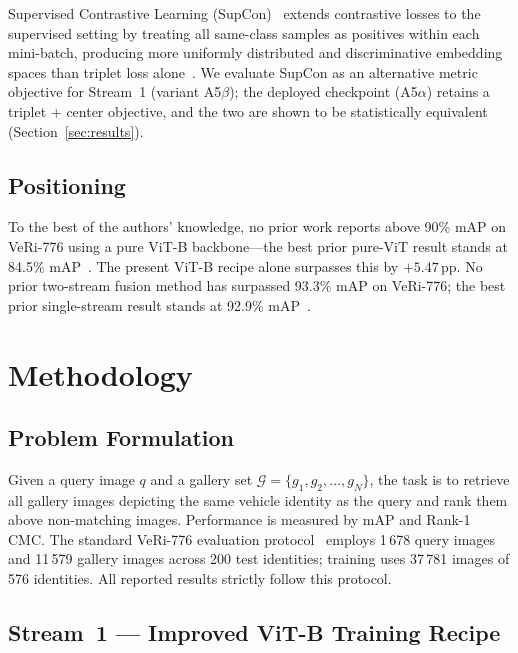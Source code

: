 \documentclass[11pt]{article}
\begin{document}
Supervised Contrastive Learning (SupCon)~\cite{khosla2020supcon} extends
contrastive losses to the supervised setting by treating all same-class samples
as positives within each mini-batch, producing more uniformly distributed and
discriminative embedding spaces than triplet loss alone~\cite{ye2021reidsurvey}.
We evaluate SupCon as an alternative metric objective for Stream~1 (variant
A5$\beta$); the deployed checkpoint (A5$\alpha$) retains a triplet + center
objective, and the two are shown to be statistically equivalent
(Section~\ref{sec:results}).

\subsection{Positioning}
To the best of the authors' knowledge, no prior work reports above 90\% mAP
on VeRi-776 using a pure ViT-B backbone---the best prior pure-ViT result
stands at 84.5\% mAP~\cite{li2023clipreid,opencodepapers2024veri}. The
present ViT-B recipe alone surpasses this by $+5.47$\,pp. No prior
two-stream fusion method has surpassed 93.3\% mAP on VeRi-776; the best
prior single-stream result stands at 92.9\% mAP~\cite{lu2025clipsenet}.

\section{Methodology}
\label{sec:method}

\subsection{Problem Formulation}
Given a query image $q$ and a gallery set
$\mathcal{G} = \{g_1, g_2, \ldots, g_N\}$, the task is to retrieve all
gallery images depicting the same vehicle identity as the query and rank them
above non-matching images. Performance is measured by mAP and Rank-1 CMC.
The standard VeRi-776 evaluation protocol~\cite{liu2018provid} employs 1\,678
query images and 11\,579 gallery images across 200 test identities; training
uses 37\,781 images of 576 identities. All reported results strictly follow
this protocol.

\subsection{Stream~1 --- Improved ViT-B Training Recipe}
\end{document}
